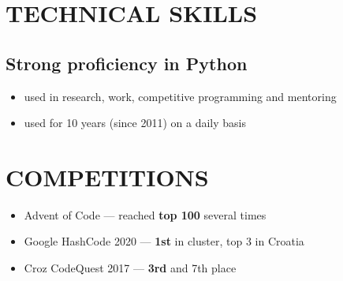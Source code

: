 \documentclass{article}
\begin{document}
\section{TECHNICAL SKILLS}
\subsection{Strong proficiency in Python}
\begin{itemize}
  \itemsep0em
  \item used in research, work, competitive programming and mentoring
  \item used for 10 years (since 2011) on a daily basis
\end{itemize}



\section{COMPETITIONS}
\begin{itemize}
  \itemsep0em
  \item Advent of Code --- reached {\bfseries top 100} several times
  \item Google HashCode 2020 --- {\bfseries 1st} in cluster, top 3 in Croatia
  \item Croz CodeQuest 2017 --- {\bfseries 3rd} and 7th place
\end{itemize}
\end{document}
